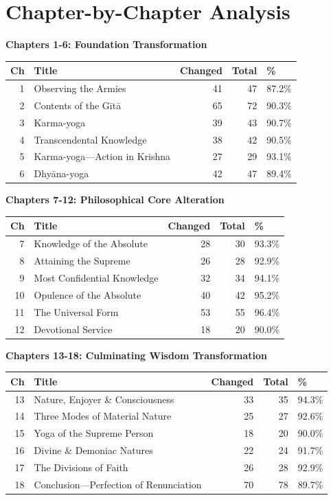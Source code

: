 \documentclass[11pt,twoside]{book}
\begin{document}
\section*{Chapter-by-Chapter Analysis}
\label{sec:org6008314}

\textbf{\textbf{Chapters 1-6: Foundation Transformation}}

\small
\begin{center}
\begin{tabular}{rlrrl}
Ch & Title & Changed & Total & \%\\
\hline
1 & Observing the Armies & 41 & 47 & 87.2\%\\
2 & Contents of the Gītā & 65 & 72 & 90.3\%\\
3 & Karma-yoga & 39 & 43 & 90.7\%\\
4 & Transcendental Knowledge & 38 & 42 & 90.5\%\\
5 & Karma-yoga—Action in Krishna & 27 & 29 & 93.1\%\\
6 & Dhyāna-yoga & 42 & 47 & 89.4\%\\
\end{tabular}
\end{center}

\textbf{\textbf{Chapters 7-12: Philosophical Core Alteration}}

\small
\begin{center}
\begin{tabular}{rlrrl}
Ch & Title & Changed & Total & \%\\
\hline
7 & Knowledge of the Absolute & 28 & 30 & 93.3\%\\
8 & Attaining the Supreme & 26 & 28 & 92.9\%\\
9 & Most Confidential Knowledge & 32 & 34 & 94.1\%\\
10 & Opulence of the Absolute & 40 & 42 & 95.2\%\\
11 & The Universal Form & 53 & 55 & 96.4\%\\
12 & Devotional Service & 18 & 20 & 90.0\%\\
\end{tabular}
\end{center}

\textbf{\textbf{Chapters 13-18: Culminating Wisdom Transformation}}

\small
\begin{center}
\begin{tabular}{rlrrl}
Ch & Title & Changed & Total & \%\\
\hline
13 & Nature, Enjoyer \& Consciousness & 33 & 35 & 94.3\%\\
14 & Three Modes of Material Nature & 25 & 27 & 92.6\%\\
15 & Yoga of the Supreme Person & 18 & 20 & 90.0\%\\
16 & Divine \& Demoniac Natures & 22 & 24 & 91.7\%\\
17 & The Divisions of Faith & 26 & 28 & 92.9\%\\
18 & Conclusion—Perfection of Renunciation & 70 & 78 & 89.7\%\\
\end{tabular}
\end{center}
\end{document}
